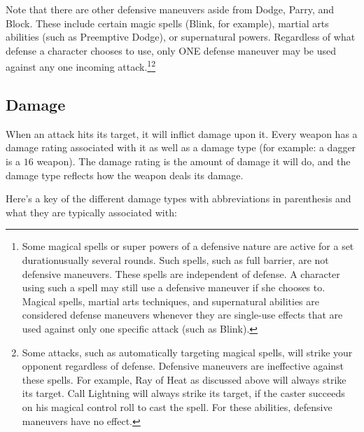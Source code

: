 \documentclass[twoside]{book}
\begin{document}
    {  
     Note that there are other defensive maneuvers
              aside from Dodge, Parry, and Block. These include
              certain magic spells (Blink, for example), martial arts
              abilities (such as Preemptive Dodge), or supernatural
              powers. Regardless of what defense a character chooses
              to use, only ONE defense maneuver may be used against
              any one incoming attack.\footnote{ Some magical spells or
              super powers of a defensive nature are active for a set
              durationusually several rounds. Such spells, such
              as full barrier, are not defensive maneuvers. These
              spells are independent of defense. A character using
              such a spell may still use a defensive maneuver if she
              chooses to.  Magical spells, martial arts techniques,
              and supernatural abilities are considered defense
              maneuvers whenever they are single-use effects that are
              used against only one specific attack (such as
              Blink).}\footnote{ Some attacks, such as
              automatically targeting magical spells, will strike your
              opponent regardless of defense. Defensive maneuvers are
              ineffective against these spells. For example, Ray of
              Heat as discussed above will always strike its
              target. Call Lightning will always strike its target, if
              the caster succeeds on his magical control roll to cast
              the spell. For these abilities, defensive maneuvers have
              no effect. }
            
    }
  
    

\subsection{Damage}
    
    {  
     When an attack hits its target, it will inflict
               damage upon it. Every weapon has a damage rating
               associated with it as well as a damage type (for example:
               a dagger is a \ensuremath{1}\ensuremath{6}\ensuremath{} weapon). The damage rating is the
               amount of damage it will do, and the damage type reflects
               how the weapon deals its damage. 
    }
  
    {  
     Here's a key of the different damage types
               with abbreviations in parenthesis and what they are
               typically associated with: 
    }
  
\end{document}
